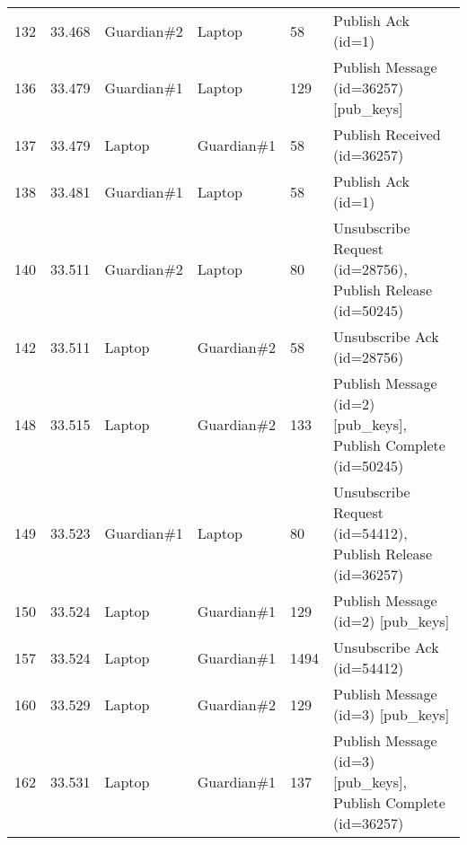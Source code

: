 \begin{table}[]
\begin{tabular}{llllll}
132 & 33.468 & Guardian\#2 & Laptop      & 58     & Publish Ack (id=1)                                                                                                                     \\
136 & 33.479 & Guardian\#1 & Laptop      & 129    & Publish Message (id=36257) {[}pub\_keys{]}                                                                                             \\
137 & 33.479 & Laptop      & Guardian\#1 & 58     & Publish Received (id=36257)                                                                                                            \\
138 & 33.481 & Guardian\#1 & Laptop      & 58     & Publish Ack (id=1)                                                                                                                     \\
140 & 33.511 & Guardian\#2 & Laptop      & 80     & Unsubscribe Request (id=28756), Publish Release (id=50245)                                                                             \\
142 & 33.511 & Laptop      & Guardian\#2 & 58     & Unsubscribe Ack (id=28756)                                                                                                             \\
148 & 33.515 & Laptop      & Guardian\#2 & 133    & Publish Message (id=2) {[}pub\_keys{]}, Publish Complete (id=50245)                                                                    \\
149 & 33.523 & Guardian\#1 & Laptop      & 80     & Unsubscribe Request (id=54412), Publish Release (id=36257)                                                                             \\
150 & 33.524 & Laptop      & Guardian\#1 & 129    & Publish Message (id=2) {[}pub\_keys{]}                                                                                                 \\
157 & 33.524 & Laptop      & Guardian\#1 & 1494   & Unsubscribe Ack (id=54412)                                                                                                             \\
160 & 33.529 & Laptop      & Guardian\#2 & 129    & Publish Message (id=3) {[}pub\_keys{]}                                                                                                 \\
162 & 33.531 & Laptop      & Guardian\#1 & 137    & Publish Message (id=3) {[}pub\_keys{]}, Publish Complete (id=36257)                                                                    \\

\end{tabular}
\end{table}
